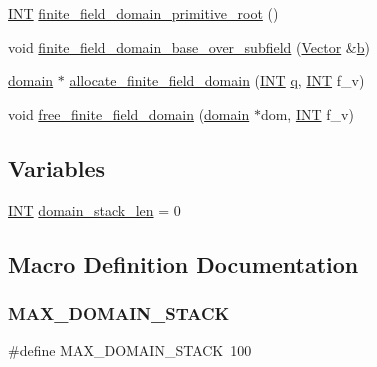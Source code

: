 \begin{DoxyCompactItemize}
\item 
\mbox{\hyperlink{galois_8h_a09fddde158a3a20bd2dcadb609de11dc}{I\+NT}} \mbox{\hyperlink{domain_8_c_a555c8e00dea5b275e2b31616e8fc1116}{finite\+\_\+field\+\_\+domain\+\_\+primitive\+\_\+root}} ()
\item 
void \mbox{\hyperlink{domain_8_c_abe355695b9ac715e7ac5fdd804f4079d}{finite\+\_\+field\+\_\+domain\+\_\+base\+\_\+over\+\_\+subfield}} (\mbox{\hyperlink{class_vector}{Vector}} \&\mbox{\hyperlink{alphabet2_8_c_a148e3876077787926724625411d6e7a9}{b}})
\item 
\mbox{\hyperlink{classdomain}{domain}} $\ast$ \mbox{\hyperlink{domain_8_c_a2eea8f610abf6ec2338fe7d05d22c47c}{allocate\+\_\+finite\+\_\+field\+\_\+domain}} (\mbox{\hyperlink{galois_8h_a09fddde158a3a20bd2dcadb609de11dc}{I\+NT}} \mbox{\hyperlink{simeon_8_c_a92cbb483a3b27ae1a0dbfcb125ce216f}{q}}, \mbox{\hyperlink{galois_8h_a09fddde158a3a20bd2dcadb609de11dc}{I\+NT}} f\+\_\+v)
\item 
void \mbox{\hyperlink{domain_8_c_ada09fec3ddf0e1929a2dacac6586dc53}{free\+\_\+finite\+\_\+field\+\_\+domain}} (\mbox{\hyperlink{classdomain}{domain}} $\ast$dom, \mbox{\hyperlink{galois_8h_a09fddde158a3a20bd2dcadb609de11dc}{I\+NT}} f\+\_\+v)
\end{DoxyCompactItemize}
\subsection*{Variables}
\begin{DoxyCompactItemize}
\item 
\mbox{\hyperlink{galois_8h_a09fddde158a3a20bd2dcadb609de11dc}{I\+NT}} \mbox{\hyperlink{domain_8_c_a16066eba3c866cb060da7f60521a281a}{domain\+\_\+stack\+\_\+len}} = 0
\end{DoxyCompactItemize}


\subsection{Macro Definition Documentation}
\mbox{\label{domain_8_c_ab6352cd9d408f93a8719644a940c2fad}} 
\subsubsection{\texorpdfstring{M\+A\+X\+\_\+\+D\+O\+M\+A\+I\+N\+\_\+\+S\+T\+A\+CK}{MAX\_DOMAIN\_STACK}}
{\footnotesize\ttfamily \#define M\+A\+X\+\_\+\+D\+O\+M\+A\+I\+N\+\_\+\+S\+T\+A\+CK~100}

